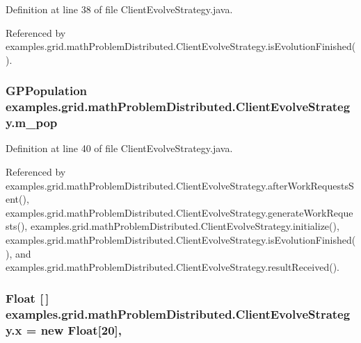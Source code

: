 Definition at line 38 of file Client\-Evolve\-Strategy.\-java.



Referenced by examples.\-grid.\-math\-Problem\-Distributed.\-Client\-Evolve\-Strategy.\-is\-Evolution\-Finished().

\hypertarget{classexamples_1_1grid_1_1math_problem_distributed_1_1_client_evolve_strategy_afb7ebd90cdce7410e2d66a3b5fa512a4}{
\subsubsection[{m\-\_\-pop}]{\setlength{\rightskip}{0pt plus 5cm}G\-P\-Population examples.\-grid.\-math\-Problem\-Distributed.\-Client\-Evolve\-Strategy.\-m\-\_\-pop\hspace{0.3cm}{\ttfamily [private]}}}\label{classexamples_1_1grid_1_1math_problem_distributed_1_1_client_evolve_strategy_afb7ebd90cdce7410e2d66a3b5fa512a4}


Definition at line 40 of file Client\-Evolve\-Strategy.\-java.



Referenced by examples.\-grid.\-math\-Problem\-Distributed.\-Client\-Evolve\-Strategy.\-after\-Work\-Requests\-Sent(), examples.\-grid.\-math\-Problem\-Distributed.\-Client\-Evolve\-Strategy.\-generate\-Work\-Requests(), examples.\-grid.\-math\-Problem\-Distributed.\-Client\-Evolve\-Strategy.\-initialize(), examples.\-grid.\-math\-Problem\-Distributed.\-Client\-Evolve\-Strategy.\-is\-Evolution\-Finished(), and examples.\-grid.\-math\-Problem\-Distributed.\-Client\-Evolve\-Strategy.\-result\-Received().

\hypertarget{classexamples_1_1grid_1_1math_problem_distributed_1_1_client_evolve_strategy_aac86cd006f0a8604f858b04d8a6922d8}{
\subsubsection[{x}]{\setlength{\rightskip}{0pt plus 5cm}Float \mbox{[}$\,$\mbox{]} examples.\-grid.\-math\-Problem\-Distributed.\-Client\-Evolve\-Strategy.\-x = new Float\mbox{[}20\mbox{]}\hspace{0.3cm}{\ttfamily [static]}, {\ttfamily [private]}}}\label{classexamples_1_1grid_1_1math_problem_distributed_1_1_client_evolve_strategy_aac86cd006f0a8604f858b04d8a6922d8}


